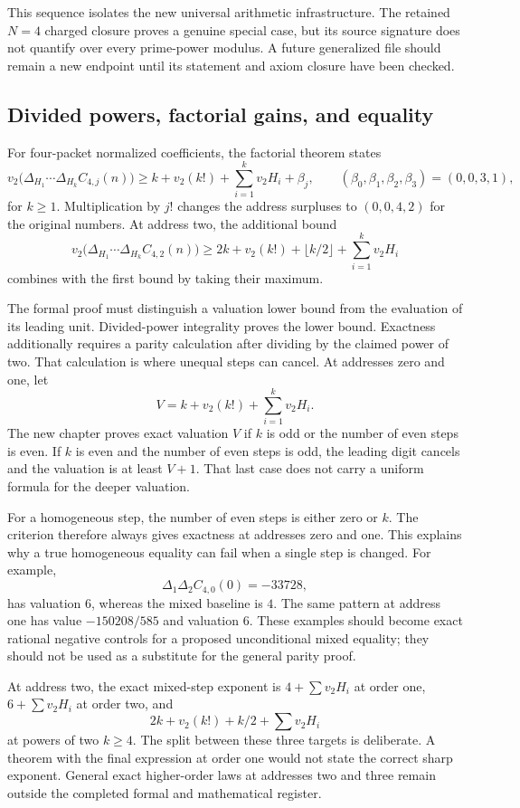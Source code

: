 This sequence isolates the new universal arithmetic infrastructure. The retained $N=4$ charged closure proves a genuine special case, but its source signature does not quantify over every prime-power modulus. A future generalized file should remain a new endpoint until its statement and axiom closure have been checked.

\subsection{Divided powers, factorial gains, and equality}
For four-packet normalized coefficients, the factorial theorem states
\[
 v_2\bigl(\Delta_{H_1}\cdots\Delta_{H_k}C_{4,j}(n)\bigr)
 \ge k+v_2(k!)+\sum_{i=1}^k v_2H_i+\beta_j,
 \qquad (\beta_0,\beta_1,\beta_2,\beta_3)=(0,0,3,1),
\]
for $k\ge1$. Multiplication by $j!$ changes the address surpluses to $(0,0,4,2)$ for the original numbers. At address two, the additional bound
\[
 v_2\bigl(\Delta_{H_1}\cdots\Delta_{H_k}C_{4,2}(n)\bigr)
 \ge2k+v_2(k!)+\lfloor k/2\rfloor+\sum_{i=1}^k v_2H_i
\]
combines with the first bound by taking their maximum.

The formal proof must distinguish a valuation lower bound from the evaluation of its leading unit. Divided-power integrality proves the lower bound. Exactness additionally requires a parity calculation after dividing by the claimed power of two. That calculation is where unequal steps can cancel. At addresses zero and one, let
\[
 V=k+v_2(k!)+\sum_{i=1}^k v_2H_i.
\]
The new chapter proves exact valuation $V$ if $k$ is odd or the number of even steps is even. If $k$ is even and the number of even steps is odd, the leading digit cancels and the valuation is at least $V+1$. That last case does not carry a uniform formula for the deeper valuation.

For a homogeneous step, the number of even steps is either zero or $k$. The criterion therefore always gives exactness at addresses zero and one. This explains why a true homogeneous equality can fail when a single step is changed. For example,
\[
 \Delta_1\Delta_2 C_{4,0}(0)=-33728,
\]
has valuation $6$, whereas the mixed baseline is $4$. The same pattern at address one has value $-150208/585$ and valuation $6$. These examples should become exact rational negative controls for a proposed unconditional mixed equality; they should not be used as a substitute for the general parity proof.

At address two, the exact mixed-step exponent is $4+\sum v_2H_i$ at order one, $6+\sum v_2H_i$ at order two, and
\[
 2k+v_2(k!)+k/2+\sum v_2H_i
\]
at powers of two $k\ge4$. The split between these three targets is deliberate. A theorem with the final expression at order one would not state the correct sharp exponent. General exact higher-order laws at addresses two and three remain outside the completed formal and mathematical register.


